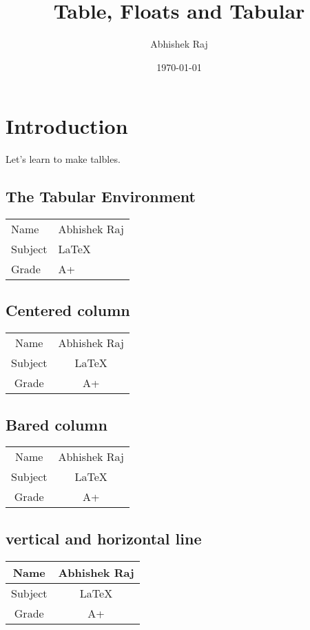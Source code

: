 \documentclass{article}
\title{Table, Floats and Tabular }
\author{Abhishek Raj}
\date{\today}
\begin{document}
	\maketitle
	
	\section{Introduction}
	Let's learn to make talbles.
	
	\subsection{The Tabular Environment}
	
	\begin{tabular}{ll}
		Name & Abhishek Raj \\
		Subject & \LaTeX	\\
		Grade & A+		\\
	\end{tabular}
	
	\subsection{Centered column}
	\begin{tabular}{cc}
		Name & Abhishek Raj \\
		Subject & \LaTeX	\\
		Grade & A+		\\
	\end{tabular}
	
	\subsection{Bared column}
	\begin{tabular}{|c|c|}
		Name & Abhishek Raj \\
		Subject & \LaTeX	\\
		Grade & A+		\\
	\end{tabular}

	\subsection{vertical and horizontal line}
	\begin{tabular}{|c|c|}
		\hline
		Name & Abhishek Raj \\
		\hline
		Subject & \LaTeX	\\
		\hline
		Grade & A+		\\
		\hline
	\end{tabular}	
\end{document}

